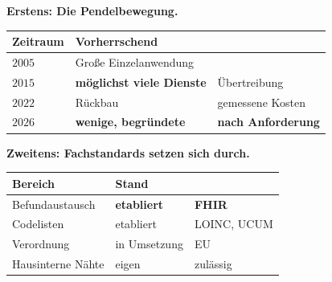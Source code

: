\begin{aktuell}
\textbf{Erstens: Die Pendelbewegung.}

\begin{center}
\renewcommand{\arraystretch}{1.45}
\begin{tabular}{@{}P{2.2cm}P{2.8cm}P{2.8cm}@{}}
\toprule
\textbf{Zeitraum} & \textbf{Vorherrschend} & \\
\midrule
$2005$ & Große Einzelanwendung & \\
$2015$ & \textbf{möglichst viele Dienste} & \textcolor{akzent}{Übertreibung}\\
$2022$ & Rückbau & \textcolor{gruen}{gemessene Kosten}\\
$2026$ & \textbf{wenige, begründete} & \textcolor{gruen}{\textbf{nach Anforderung}}\\
\bottomrule
\end{tabular}
\end{center}

\begin{center}
\begin{minipage}{0.86\textwidth}
\end{minipage}
\end{center}

\medskip
\textbf{Zweitens: Fachstandards setzen sich durch.}

\begin{center}
\renewcommand{\arraystretch}{1.45}
\begin{tabular}{@{}P{3.0cm}P{2.2cm}P{2.6cm}@{}}
\toprule
\textbf{Bereich} & \textbf{Stand} & \\
\midrule
Befundaustausch & \textcolor{gruen}{\textbf{etabliert}} & \textbf{FHIR}\\
Codelisten & \textcolor{gruen}{etabliert} & LOINC, UCUM\\
Verordnung & \textcolor{gruen}{in Umsetzung} & \textcolor{gruen}{EU}\\
Hausinterne Nähte & \textcolor{mittel}{eigen} & \textcolor{gruen}{zulässig}\\
\bottomrule
\end{tabular}
\end{center}

\begin{center}
\end{center}


\end{aktuell}
